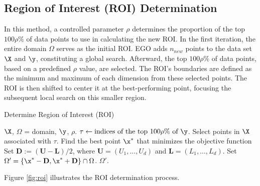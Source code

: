 \documentclass [PhD] {package/uclathes}
\begin{document}
\subsection{Region of Interest (ROI) Determination}
In this method, a controlled parameter \(\rho\) determines the proportion of the top \(100\rho\%\) of data points to use in calculating the new ROI. In the first iteration, the entire domain \(\Omega\) serves as the initial ROI. EGO adds $n_{new}$ points to the data set \(\X\) and \(\y\), constituting a global search. Afterward, the top \(100\rho\%\) of data points, based on a predefined \(\rho\) value, are selected. The ROI's boundaries are defined as the minimum and maximum of each dimension from these selected points. The ROI is then shifted to center it at the best-performing point, focusing the subsequent local search on this smaller region.

\begin{algorithm}
    \caption{Determine Region of Interest (ROI)}\label{alg:roi}
    \begin{algorithmic}[1]
        \Require $\X$, $\Omega$ = domain, $\y$, $\rho$.
        \State $\tau \gets \text{indices of the top } 100\rho\% \text{ of } \y$.
        \State Select points in $\X$ associated with $\tau$.
        \State Find the best point $\x^*$ that minimizes the objective function  %
        \State Set $\mathbf{D} := (\mathbf{U} - \mathbf{L})/2$, where $\mathbf{U}=(U_1, \ldots, U_d)$ and $\mathbf{L}=(L_1, \ldots, L_d)$.
        \State Set {$\Omega' =  \left\{\x^* - \mathbf{D},  \x^* + \mathbf{D} \right\} \cap \Omega$.}
        \State \Return $\Omega'$.
    \end{algorithmic}
\end{algorithm}




Figure \ref{fig:roi} illustrates the ROI determination process.
\end{document}
